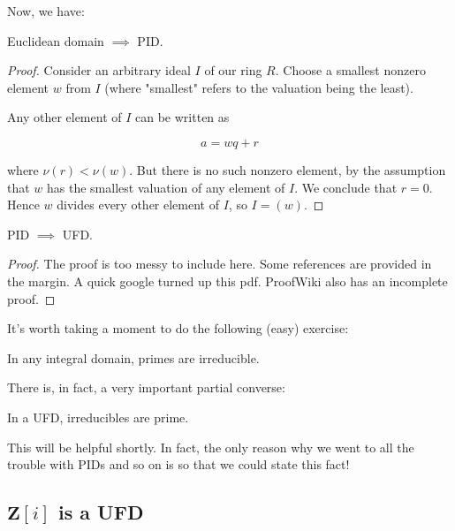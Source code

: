 Now, we have:

\begin{theorem}
  Euclidean domain \(\implies\) PID.
\end{theorem}
\begin{proof}
  Consider an arbitrary ideal \(I\) of our ring \(R\). Choose a smallest nonzero
  element \(w\) from \(I\) (where "smallest" refers to the valuation being the
  least).

  Any other element of \(I\) can be written as

  \[a = wq + r\]

  where \(\nu(r) < \nu(w)\). But there is no such nonzero element, by the
  assumption that \(w\) has the smallest valuation of any element of \(I\). We
  conclude that \(r=0\). Hence \(w\) divides every other element of \(I\), so
  \(I=(w)\).
\end{proof}

\begin{atheorem}
  PID \(\implies\) UFD.
\end{atheorem}

\begin{proof}
  The proof is too messy to include here. Some references are provided in the
  margin. A quick google turned up this pdf. ProofWiki also has an incomplete
  proof.
\end{proof}



It's worth taking a moment to do the following (easy) exercise:

\begin{exercise}
  In any integral domain, primes are irreducible.
\end{exercise}

There is, in fact, a very important partial converse:

\begin{exercise}
  In a UFD, irreducibles are prime.
\end{exercise}

This will be helpful shortly. In fact, the only reason why we went to all the
trouble with PIDs and so on is so that we could state this fact!

\subsection{\({\mathbf Z}[i]\) is a UFD}

